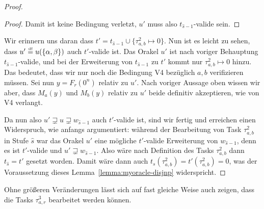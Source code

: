 \begin{proof}
\begin{proof}
    Damit ist keine Bedingung verletzt, $u'$ muss also $t_{\hat{s}-1}$-valide sein.
\end{proof}
Wir erinnern uns daran dass $t'=t_{\hat{s}-1}\cup \{\tau^2_{a,b}\mapsto 0\}$.
Nun ist es leicht zu sehen, dass $u'\stackrel{\text{\smash{\tiny df}}}{=} u(\{\alpha,\beta\})$ auch $t'$-valide ist. Das Orakel $u'$ ist nach voriger Behauptung $t_{\hat{s}-1}$-valide, und bei der Erweiterung von $t_{\hat{s}-1}$ zu $t'$ kommt nur $\tau^2_{a,b}\mapsto 0$ hinzu. Das bedeutet, dass wir nur noch die Bedingung V4 bezüglich $a,b$ verifizieren müssen.
Sei nun $y=F_r(0^n)$ relativ zu $u'$.
Nach voriger Aussage oben wissen wir aber, dass $M_a(y)$ und $M_b(y)$ relativ zu $u'$ beide definitiv akzeptieren, wie von V4 verlangt.

Da nun also $u'\sqsupsetneq u \sqsupsetneq w_{\hat{s}-1}$ auch $t'$-valide ist, sind wir fertig und erreichen einen Widerspruch, wie anfangs argumentiert: während der Bearbeitung von Task $\tau^2_{a,b}$ in Stufe $\hat{s}$ war das Orakel $u'$ eine mögliche $t'$-valide Erweiterung von $w_{\hat{s}-1}$, denn es ist $t'$-valide und $u'\sqsupsetneq w_{\hat{s}-1}$. Also wäre nach Definition des Tasks $\tau^2_{a,b}$ dann $t_{\hat{s}}=t'$ gesetzt worden.
Damit wäre dann auch $t_{s}(\tau^2_{a,b})=t'(\tau^2_{a,b})=0$, was der Voraussetzung dieses Lemma~\ref{lemma:myoracle-disjnp} widerspricht.
\end{proof}

Ohne größeren Veränderungen lässt sich auf fast gleiche Weise auch zeigen, dass die Tasks $\tau^3_{a,r}$ bearbeitet werden können.

